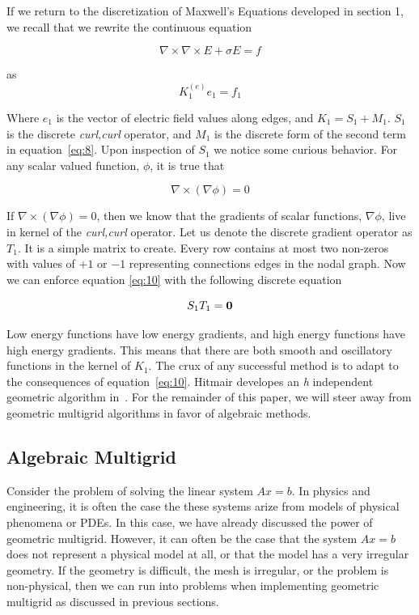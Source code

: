 \documentclass{article}
\newcommand{\curl}[1]{\nabla \times {#1}}
\begin{document}
If we return to the discretization of Maxwell's Equations developed in section 1, we recall that we rewrite the continuous equation

\begin{equation}
\label{eq:8}
\curl{\curl{E}} + \sigma E = f 
\end{equation}

as
\begin{equation}
\label{eq:9}
K_1^{(e)} e_1 = f_1
\end{equation}

Where $e_1$ is the vector of electric field values along edges, and $K_1 = S_1 + M_1$.  $S_1$ is the discrete \textit{curl,curl} operator, and $M_1$ is the discrete form of the second term in equation~\ref{eq:8}.  Upon inspection of $S_1$ we notice some curious behavior. For any scalar valued function, $\phi$, it is true that 

\begin{equation}
\label{eq:10}
\curl{(\nabla \phi)} = 0
\end{equation}

 If  $\curl{(\nabla \phi)} = 0$, then we know that the gradients of scalar functions, $\nabla\phi$, live in kernel of the \textit{curl,curl} operator. Let us denote the discrete gradient operator as $T_1$.  It is a simple matrix to create. Every row contains at most two non-zeros with values of $+1$ or $-1$ representing connections edges in the nodal graph. Now we can enforce equation \ref{eq:10} with the following discrete equation

$$S_1T_1 = \bf{0}$$

Low energy functions have low energy gradients, and high energy functions have high energy gradients.  This means that there are both smooth and oscillatory functions in the kernel of $K_1$. The crux of any successful method is to adapt to the consequences of equation~\ref{eq:10}.  Hitmair developes an \textit{h} independent geometric algorithm in~\cite{hiptmair1998multigrid}.  For the remainder of this paper, we will steer away from geometric multigrid algorithms in favor of algebraic methods.

\subsection{Algebraic Multigrid} 

Consider the problem of solving the linear system $Ax = b$.  In physics and engineering, it is often the case the these systems arize from models of physical phenomena or PDEs.  In this case, we have already discussed the power of geometric multigrid.  However, it can often be the case that the system $Ax=b$ does not represent a physical model at all, or that the model has a very irregular geometry.  If the geometry is difficult, the mesh is irregular, or the problem is non-physical, then we can run into problems when implementing geometric multigrid as discussed in previous sections.  
\end{document}
